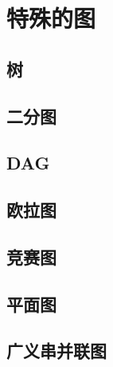 \chapter{特殊的图}

\section{树}

\section{二分图}

\section{DAG}



\section{欧拉图}

\section{竞赛图}

\section{平面图}


\section{广义串并联图}



